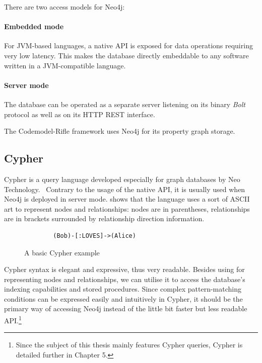 There are two access models for Neo4j:

\paragraph{Embedded mode} For JVM-based languages, a native API is exposed for data operations requiring very low latency. This makes the database directly embeddable to any software written in a JVM-compatible language.

\paragraph{Server mode} The database can be operated as a separate server listening on its binary \emph{Bolt} protocol as well as on its HTTP REST interface.

The Codemodel-Rifle framework uses Neo4j for its property graph storage.

\subsection{Cypher}

Cypher is a query language developed especially for graph databases by Neo Technology.~\cite{neo4j-cypher} Contrary to the usage of the native API, it is usually used when Neo4j is deployed in server mode.  shows that the language uses a sort of ASCII art to represent nodes and relationships: nodes are in parentheses, relationships are in brackets surrounded by relationship direction information.

\begin{figure}[!htb]
	\centering
	\begin{minipage}{25em}
		\begin{verbatim}
		(Bob)-[:LOVES]->(Alice)
		\end{verbatim}
	\end{minipage}
  \caption{A basic Cypher example}
	\label{fig:cypher-intro}
\end{figure}

Cypher syntax is elegant and expressive, thus very readable. Besides using for representing nodes and relationships, we can utilise it to access the database's indexing capabilities and stored procedures. Since complex pattern-matching conditions can be expressed easily and intuitively in Cypher, it should be the primary way of accessing Neo4j instead of the little bit faster but less readable API.\footnote{Since the subject of this thesis mainly features Cypher queries, Cypher is detailed further in Chapter 5.}



